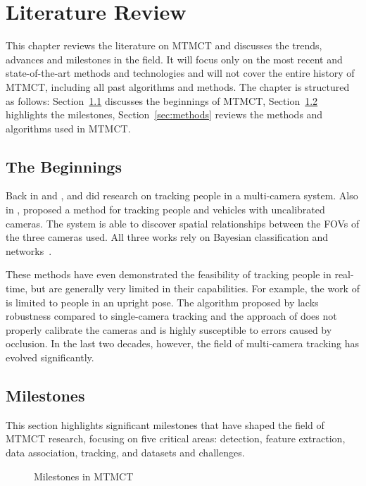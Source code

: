\chapter{Literature Review}\label{chap:literature_review}
This chapter reviews the literature on MTMCT and discusses the trends, advances and milestones in the field. It will focus only on the most recent and state-of-the-art methods and technologies and will not cover the entire history of MTMCT, including all past algorithms and methods. The chapter is structured as follows: Section~\ref{sec:the_beginnings} discusses the beginnings of MTMCT, Section~\ref{sec:milestones} highlights the milestones, Section~\ref{sec:methods} reviews the methods and algorithms used in MTMCT.

\section{The Beginnings}\label{sec:the_beginnings}
Back in \citeyear{Cai99} and \citeyear{Chang01}, \textcite{Cai99} and \textcite{Chang01} did research on tracking people in a multi-camera system. Also in \citeyear{Khan01}, \textcite{Khan01} proposed a method for tracking people and vehicles with uncalibrated cameras. The system is able to discover spatial relationships between the FOVs of the three cameras used. All three works rely on Bayesian classification and networks~\cite{Pearl88}.

These methods have even demonstrated the feasibility of tracking people in real-time, but are generally very limited in their capabilities. For example, the work of \citeauthor{Chang01} is limited to people in an upright pose. The algorithm proposed by \citeauthor{Cai99} lacks robustness compared to single-camera tracking and the approach of \citeauthor{Khan01} does not properly calibrate the cameras and is highly susceptible to errors caused by occlusion. In the last two decades, however, the field of multi-camera tracking has evolved significantly.

\section{Milestones}\label{sec:milestones}
This section highlights significant milestones that have shaped the field of MTMCT research, focusing on five critical areas: detection, feature extraction, data association, tracking, and datasets and challenges.

\begin{figure}[ht]
	\centering
	
	\caption{Milestones in MTMCT}\label{fig:milestones}
\end{figure}


